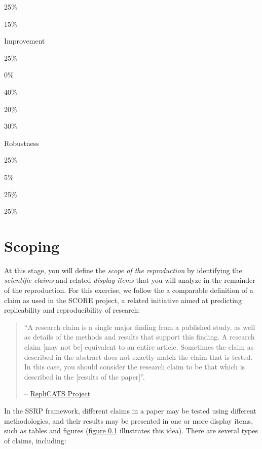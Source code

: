 \documentclass[
]{book}
\begin{document}
25\%

15\%

Improvement

25\%

0\%

40\%

20\%

30\%

Robustness

25\%

5\%

25\%

25\%

\hypertarget{scoping}{%
\chapter{Scoping}\label{scoping}}

At this stage, you will define the \emph{scope of the reproduction} by identifying the \emph{scientific claims} and related \emph{display items} that you will analyze in the remainder of the reproduction. For this exercise, we follow the a comparable definition of a claim as used in the SCORE project, a related initiative aimed at predicting replicability and reproducibility of research:

\begin{quote}
``A research claim is a single major finding from a published study, as well as details of the methods and results that support this finding. A research claim {[}may not be{]} equivalent to an entire article. Sometimes the claim as described in the abstract does not exactly match the claim that is tested. In this case, you should consider the research claim to be that which is described in the {[}results of the paper{]}''.

-- \href{https://replicats.research.unimelb.edu.au/\#tab301}{RepliCATS Project}
\end{quote}

In the SSRP framework, different claims in a paper may be tested using different methodologies, and their results may be presented in one or more display items, such as tables and figures (\href{https://bitss.github.io/ACRE/intro.html\#fig:diagram}{figure 0.1} illustrates this idea). There are several types of claims, including:
\end{document}
